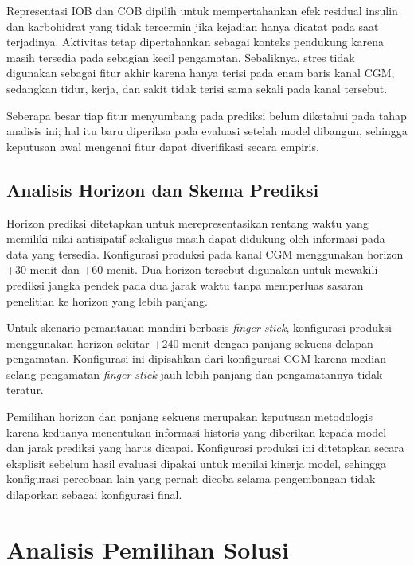 Representasi IOB dan COB dipilih untuk mempertahankan efek residual insulin dan karbohidrat yang tidak tercermin jika kejadian hanya dicatat pada saat terjadinya. Aktivitas tetap
dipertahankan sebagai konteks pendukung karena masih tersedia pada sebagian kecil pengamatan. Sebaliknya, stres tidak digunakan sebagai fitur akhir karena hanya terisi pada enam baris kanal CGM, sedangkan tidur, kerja, dan sakit tidak terisi sama sekali pada kanal
tersebut.

Seberapa besar tiap fitur menyumbang pada prediksi belum diketahui pada tahap analisis ini; hal itu baru diperiksa pada evaluasi setelah model dibangun, sehingga keputusan awal
mengenai fitur dapat diverifikasi secara empiris.

\subsection{Analisis Horizon dan Skema Prediksi} 
\label{subsec:bab3-analisis-horizon-skema-prediksi}

Horizon prediksi ditetapkan untuk merepresentasikan rentang waktu yang memiliki nilai antisipatif sekaligus masih dapat didukung oleh informasi pada data yang tersedia. Konfigurasi
produksi pada kanal CGM menggunakan horizon +30 menit dan +60 menit. Dua horizon tersebut digunakan untuk mewakili prediksi jangka pendek pada dua jarak waktu tanpa memperluas sasaran
penelitian ke horizon yang lebih panjang.

Untuk skenario pemantauan mandiri berbasis \textit{finger-stick}, konfigurasi produksi menggunakan horizon sekitar +240 menit dengan panjang sekuens delapan pengamatan. Konfigurasi
ini dipisahkan dari konfigurasi CGM karena median selang pengamatan \textit{finger-stick} jauh lebih panjang dan pengamatannya tidak teratur.

Pemilihan horizon dan panjang sekuens merupakan keputusan metodologis karena keduanya menentukan informasi historis yang diberikan kepada model dan jarak prediksi yang harus
dicapai. Konfigurasi produksi ini ditetapkan secara eksplisit sebelum hasil evaluasi dipakai untuk menilai kinerja model, sehingga konfigurasi percobaan lain yang pernah dicoba
selama pengembangan tidak dilaporkan sebagai konfigurasi final.

\section{Analisis Pemilihan Solusi}
\label{sec:bab3-analisis-pemilihan-solusi}

